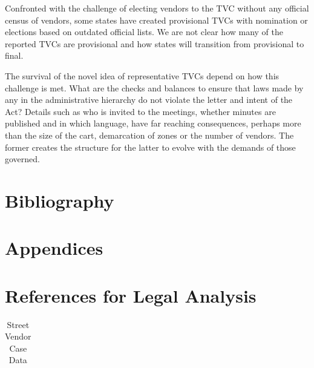\documentclass[a4paper, 12pt, twoside, table]{article}
\begin{document}
{{Confronted with the challenge of electing vendors to the TVC without any official census of vendors, some states have created provisional TVCs with nomination or elections based on outdated official lists. We are not clear how many of the reported TVCs are provisional and how states will transition from provisional to final. 

The survival of the novel idea of representative TVCs depend on how this challenge is met. What are the checks and balances to ensure that laws made by any in the administrative hierarchy do not violate the letter and intent of the Act? Details such as who is invited to the meetings, whether minutes are published and in which language, have far reaching consequences, perhaps more than the size of the cart, demarcation of zones or the number of vendors. The former creates the structure for the latter to evolve with the demands of those governed.


\newpage
\section*{Bibliography}
\printbibliography[heading=none]

           
\newpage
\appendix
\begin{landscape} 
\section*{Appendices}

\section{References for Legal Analysis}
\label{appendix: court cases}
            \scriptsize
            \begin{longtable}{>{\raggedright}p{1.5cm}>{\raggedright}p{2.5cm}>{\raggedright}p{1.3cm}>{\raggedright}p{1.5cm}>{\raggedright}p{1.1cm}>{\raggedright}p{1.2cm}>{\raggedright}p{1cm}>{\raggedright}p{1.8cm}>{\raggedright}p{1.3cm}>{\raggedright}p{4.45cm}>{\raggedright\arraybackslash}p{1.2cm}}
          
            \caption{Street Vendor Case Data}\\


\end{longtable}
\end{landscape}}}
\end{document}

